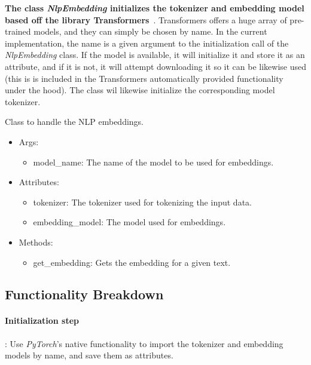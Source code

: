 \documentclass[a4paper, 11pt]{report}
\begin{document}
   \textbf{The class \textit{NlpEmbedding} initializes the tokenizer and embedding model based off the library Transformers}~\cite{huggingface_transformers}. Transformers offers a huge array of pre-trained models, and they can simply be chosen by name. In the current implementation, the name is a given argument to the initialization call of the \textit{NlpEmbedding} class. If the model is available, it will initialize it and store it as an attribute, and if it is not, it will attempt downloading it so it can be likewise used (this is is included in the Transformers automatically provided functionality under the hood). The class wil likewise initialize the corresponding model tokenizer.

   \begin{tcolorbox}[title=NlpEmbedding - From the docs]
    Class to handle the NLP embeddings.

    \begin{itemize}
        \item Args:
        \begin{itemize}
            \item model\_name: The name of the model to be used for embeddings.
        \end{itemize}
        \item Attributes:
        \begin{itemize}
            \item tokenizer: The tokenizer used for tokenizing the input data.
            \item embedding\_model: The model used for embeddings.
        \end{itemize}
        \item Methods:
        \begin{itemize}
            \item get\_embedding: Gets the embedding for a given text.
        \end{itemize}
    \end{itemize}
    \end{tcolorbox}
   \subsection{Functionality Breakdown}

   \paragraph{Initialization step}: Use \textit{PyTorch}'s native functionality to import the tokenizer and embedding models by name, and save them as attributes.
\end{document}
